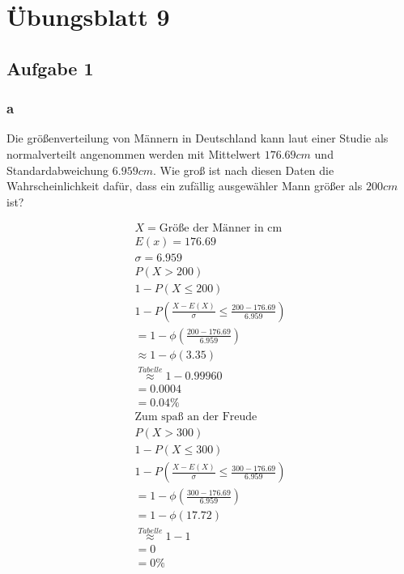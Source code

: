 \chapter{Übungsblatt 9}

\section{Aufgabe 1}

\subsection{a}

Die größenverteilung von Männern in Deutschland kann laut einer Studie als
normalverteilt angenommen werden mit Mittelwert $176.69cm$ und
Standardabweichung $6.959 cm$. Wie groß ist nach diesen Daten die
Wahrscheinlichkeit dafür, dass ein zufällig ausgewähler Mann größer als $200
    cm$ ist?

\begin{align*}
    X = \text{Größe der Männer in cm}                              \\
    E(x) = 176.69                                                  \\
    \sigma = 6.959                                                 \\
    P(X > 200)                                                     \\
    1 - P(X \leq 200)                                              \\
    1 - P(\frac{X - E(X)}{\sigma} \leq \frac{200 - 176.69}{6.959}) \\
    = 1 - \phi(\frac{200 - 176.69}{6.959})                         \\
    \approx 1 - \phi(3.35)                                         \\
    \overset{Tabelle}{\approx} 1 - 0.99960                         \\
    = 0.0004                                                       \\
    = 0.04\%                                                       \\
    \text{Zum spaß an der Freude}                                  \\
    P(X > 300)                                                     \\
    1 - P(X \leq 300)                                              \\
    1 - P(\frac{X - E(X)}{\sigma} \leq \frac{300 - 176.69}{6.959}) \\
    = 1 - \phi(\frac{300 - 176.69}{6.959})                         \\
    = 1 - \phi(17.72)                                              \\
    \overset{Tabelle}{\approx} 1 - 1                               \\
    = 0                                                            \\
    = 0\%                                                          \\
\end{align*}

